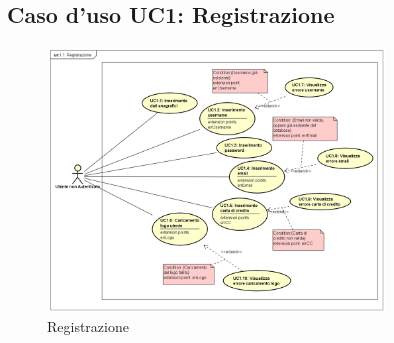 \documentclass[12pt,a4paper,titlepage]{article}
\begin{document}
	\subsection{Caso d'uso UC1: Registrazione}
	\label{UC1}
	\begin{figure}[ht]
		\centering
		\includegraphics[width=0.8\textwidth]{UseCase/Registrazione}
		\caption{Registrazione}
	\end{figure}
\end{document}
